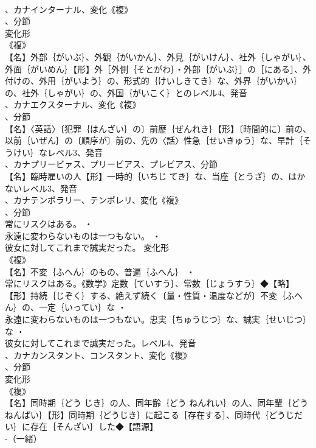 \documentclass[8pt]{extreport}
\begin{document}
\begin{CJK}{UTF8}{min}
\\	、カナインターナル、変化《複》
\\	、分節
\\	変化形 
\\	《複》
\\	【名】外部｛がいぶ｝、外観｛がいかん｝、外見｛がいけん｝、社外｛しゃがい｝、外面｛がいめん｝【形】外［外側｛そとがわ｝・外部｛がいぶ｝］の［にある］、外付けの、外用｛がいよう｝の、形式的｛けいしきてき｝な、外界｛がいかい｝の、社外｛しゃがい｝の、外国｛がいこく｝とのレベル4、発音
\\	、カナエクスターナル、変化《複》
\\	、分節
\\	【名】〈英話〉〔犯罪｛はんざい｝の〕前歴｛ぜんれき｝【形】〔時間的に〕前の、以前｛いぜん｝の〔順序が〕前の、先の〈話〉性急｛せいきゅう｝な、早計｛そうけい｝なレベル3、発音
\\	、カナプリービァス、プリービアス、プレビアス、分節
\\	【名】臨時雇いの人【形】一時的｛いちじ てき｝な、当座｛とうざ｝の、はかないレベル3、発音
\\	、カナテンポラリー、テンポレリ、変化《複》
\\	、分節
\\	常にリスクはある。 ・
\\	永遠に変わらないものは一つもない。 ・
\\	彼女に対してこれまで誠実だった。	変化形 
\\	《複》
\\	【名】不変｛ふへん｝のもの、普遍｛ふへん｝ ・
\\	常にリスクはある。《数学》定数｛ていすう｝、常数｛じょうすう｝◆【略】
\\	【形】持続｛じぞく｝する、絶えず続く〔量・性質・温度などが〕不変｛ふへん｝の、一定｛いってい｝な ・
\\	永遠に変わらないものは一つもない。忠実｛ちゅうじつ｝な、誠実｛せいじつ｝な ・
\\	彼女に対してこれまで誠実だった。レベル4、発音
\\	、カナカンスタント、コンスタント、変化《複》
\\	、分節
\\	変化形 
\\	《複》
\\	【名】同時期｛どう じき｝の人、同年齢｛どう ねんれい｝の人、同年輩｛どうねんぱい｝【形】同時期｛どうじき｝に起こる［存在する］、同時代｛どうじだい｝に存在｛そんざい｝した◆【語源】
\\	-（一緒）

\end{CJK}
\end{document}
